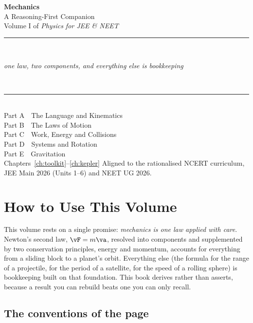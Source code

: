 \thispagestyle{empty}
\begin{center}
\vspace*{3.2cm}
{\Huge\bfseries Mechanics}\\[6mm]
{\Large A Reasoning-First Companion}\\[4mm]
{\large Volume I of \textit{Physics for JEE \& NEET}}\\[14mm]
{\color{rulegrey}\rule{0.5\textwidth}{0.9pt}}\\[8mm]
\begin{minipage}{0.76\textwidth}\centering\large\itshape
one law, two components, and everything else is bookkeeping
\end{minipage}\\[14mm]
{\color{rulegrey}\rule{0.5\textwidth}{0.4pt}}\\[12mm]
{\normalsize
Part A\ \ The Language and Kinematics\\[2mm]
Part B\ \ The Laws of Motion\\[2mm]
Part C\ \ Work, Energy and Collisions\\[2mm]
Part D\ \ Systems and Rotation\\[2mm]
Part E\ \ Gravitation\\[8mm]
Chapters~\ref{ch:toolkit}--\ref{ch:kepler}}
\vfill
{\small Aligned to the rationalised NCERT curriculum,\\
JEE Main 2026 (Units 1--6) and NEET UG 2026.}
\vspace{2cm}
\end{center}
\cleardoublepage

\chapter*{How to Use This Volume}

This volume rests on a single promise: \emph{mechanics is one law applied with care}. Newton's second
law, $\vF=m\va$, resolved into components and supplemented by two conservation principles, energy and
momentum, accounts for everything from a sliding block to a planet's orbit. Everything else (the
formula for the range of a projectile, for the period of a satellite, for the speed of a rolling
sphere) is bookkeeping built on that foundation. This book derives rather than asserts, because a
result you can rebuild beats one you can only recall.

\section*{The conventions of the page}
\begingroup\renewcommand{\thebxcount}{\unskip}

